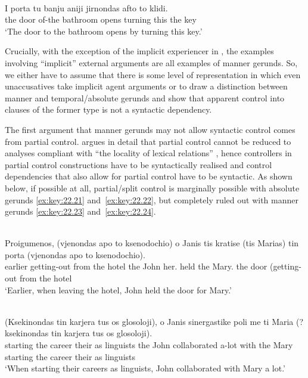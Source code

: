\documentclass[output=paper]{langsci/langscibook}
\begin{document}
\ea%
    \label{ex:key:22.20} \\
    \gll    I       porta   tu  banju    aniji  jirnondas  afto to  klidi.\\
            the   door    of-the  bathroom  opens  turning      this the  key\\
    \glt    \enquote*{The door to the bathroom opens by turning this key.}
\z

Crucially, with the exception of the implicit experiencer in ,
the examples involving “implicit” external arguments are all examples of manner
gerunds.  So, we either have to assume that there is some level of
representation in which even unaccusatives take implicit agent arguments or to
draw a distinction between manner and temporal/absolute gerunds and show that
apparent control into clauses of the former type is not a syntactic dependency.

The first argument that manner gerunds may not allow syntactic control comes
from partial control. \citet{Landau2010} argues in detail that partial control
cannot be reduced to analyses compliant with “the locality of lexical
relations” \citep[361]{Landau2010}, hence controllers in partial
control constructions
have to be syntactically realised and control dependencies that also allow for
partial control have to be syntactic. As shown below, if possible at all,
partial/split control is marginally possible with absolute gerunds
\eqref{ex:key:22.21} and~\eqref{ex:key:22.22}, but completely ruled out with
manner gerunds \eqref{ex:key:22.23} and~\eqref{ex:key:22.24}.

\ea%
    \label{ex:key:22.21} \\
    \gll    {}Proigumenos, (vjenondas apo   to   ksenodochio) o Janis tis   kratise  (tis Marias)\tss{} tin  porta (vjenondas apo   to   ksenodochio).\\
            earlier \hphantom{(}getting-out     from the hotel the  John her.\Cl{}  held the Mary.\Dat{}  the  door  \hphantom{(}(getting-out    from the hotel\\
    \glt    \enquote*{Earlier, when leaving the hotel, John held the door for Mary.}
\z

\ea%
\label{ex:key:22.22} \\
    \gll    (Ksekinondas tin karjera tus os glosoloji),  o  Janis  sinergastike  poli   me   ti Maria (?ksekinondas tin karjera tus os glosoloji).\\
            \hphantom{(}starting the career their as linguists  the  John collaborated a-lot with the Mary \hphantom{(?}starting the career their as linguists\\
    \glt    \enquote*{When starting their careers as linguists, John collaborated with Mary a lot.}
\z
\end{document}
